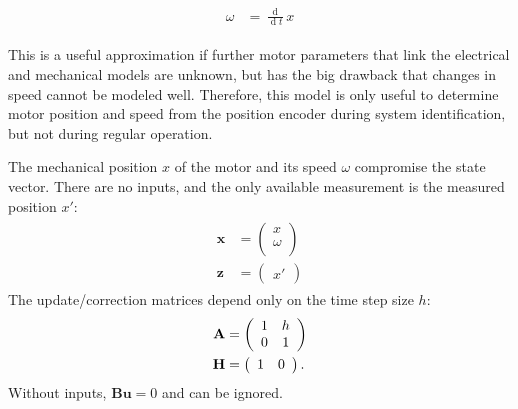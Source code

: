 \documentclass[12pt,a4paper,oneside,openany]{article}
\DeclareMathOperator{\ud}{d}
\newcommand{\vx}{\ensuremath{\mathbf{x}}}
\newcommand{\vz}{\ensuremath{\mathbf{z}}}
\newcommand{\vu}{\ensuremath{\mathbf{u}}}
\newcommand{\mA}{\ensuremath{\mathbf{A}}}
\newcommand{\mB}{\ensuremath{\mathbf{B}}}
\newcommand{\mH}{\ensuremath{\mathbf{H}}}
\begin{document}
\begin{gather}
\begin{aligned}
\omega &= \frac{\ud}{\ud t} x
\end{aligned}
\end{gather}

This is a useful approximation if further motor parameters that link the electrical and mechanical models are unknown, but has the big drawback that changes in speed cannot be modeled well. Therefore, this model is only useful to determine motor position and speed from the position encoder during system identification, but not during regular operation.

The mechanical position $x$ of the motor and its speed $\omega$ compromise the state vector. There are no inputs, and the only available measurement is the measured position $x'$:
\begin{gather}
\begin{aligned}
\vx &= \left(
\begin{array}{c}
      x  \\
 \omega \\
\end{array}
\right) \\
\vz &= \left(
\begin{array}{c}
      x'
\end{array}
\right)
\end{aligned}
\end{gather}
The update/correction matrices depend only on the time step size $h$:
\begin{gather}
\begin{aligned}
\mA &= \left(
\begin{array}{cc}
 1 & h \\
 0 & 1 \\
\end{array}
\right) \\
\mH &= \left(
\begin{array}{c c}
 1 & 0
\end{array}
\right).
\end{aligned}
\end{gather}
Without inputs, $\mB\vu = 0$ and can be ignored.
\end{document}
